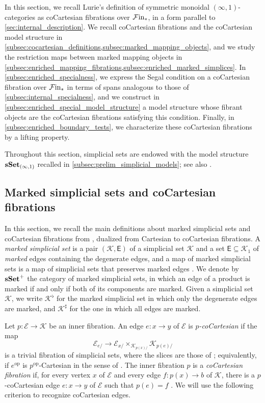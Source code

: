 \documentclass[10pt,reqno]{amsart}
\begin{document}
In this section, we recall Lurie's definition of symmetric monoidal
$(\infty,1)$-categories as coCartesian fibrations over $\mathcal{F}\mathrm{in}_*$,
in a form parallel to \cref{sec:internal_description}. We recall
coCartesian fibrations and the coCartesian model structure in
\cref{subsec:cocartesian_definitions,subsec:marked_mapping_objects},
and we study the restriction maps between marked mapping objects in
\cref{subsec:enriched_mapping_fibrations,subsec:enriched_marked_simplices}.
In \cref{subsec:enriched_specialness}, we express the Segal condition
on a coCartesian fibration over $\mathcal{F}\mathrm{in}_*$ in terms of spans analogous
to those of \cref{subsec:internal_specialness}, and we construct in
\cref{subsec:enriched_special_model_structure} a model structure whose
fibrant objects are the coCartesian fibrations satisfying this
condition. Finally, in \cref{subsec:enriched_boundary_tests}, we
characterize these coCartesian fibrations by a lifting property.

Throughout this section, simplicial sets are endowed with the model
structure $\mathbf{sSet}_{(\infty,1)}$ recalled in
\cref{subsec:prelim_simplicial_models}; see also
\cite{Joyal2008Theory}.

\subsection{Marked simplicial sets and coCartesian fibrations}
\label{subsec:cocartesian_definitions}

In this section, we recall the main definitions about marked
simplicial sets and coCartesian fibrations from
\cite[\S2.4 and \S3.1]{lurie2009higher}, dualized from Cartesian to
coCartesian fibrations. A \emph{marked simplicial set} is a pair
$(\mathcal K,\mathsf E)$ of a simplicial set $\mathcal K$ and a set
$\mathsf E\subseteq\mathcal K_1$ of \emph{marked} edges containing
the degenerate edges, and a map of marked simplicial sets is a map of
simplicial sets that preserves marked edges
\cite[Definition~3.1.0.1]{lurie2009higher}. We denote by $\mathbf{sSet}^+$
the category of marked simplicial sets, in which an edge of a product
is marked if and only if both of its components are marked. Given a
simplicial set $\mathcal K$, we write $\mathcal K^\flat$ for the
marked simplicial set in which only the degenerate edges are marked,
and $\mathcal K^\sharp$ for the one in which all edges are marked.

Let $p:\mathcal E\to\mathcal K$ be an inner fibration. An edge
$e:x\to y$ of $\mathcal E$ is \emph{$p$-coCartesian} if the map
\[
\mathcal E_{e/}\longrightarrow
\mathcal E_{x/}\times_{\mathcal K_{p(x)/}}\mathcal K_{p(e)/}
\]
is a trivial fibration of simplicial sets, where the slices are those
of \cite[Remark~1.2.9.5]{lurie2009higher}; equivalently, if
$e^{\mathrm{op}}$ is $p^{\mathrm{op}}$-Cartesian in the sense of
\cite[Definition~2.4.1.1]{lurie2009higher}. The inner fibration $p$
is a \emph{coCartesian fibration} if, for every vertex $x$ of
$\mathcal E$ and every edge $f:p(x)\to b$ of $\mathcal K$, there
is a $p$-coCartesian edge $e:x\to y$ of $\mathcal E$ such that
$p(e)=f$ \cite[Definition~2.4.2.1]{lurie2009higher}. We will use the
following criterion to recognize coCartesian edges.
\end{document}
